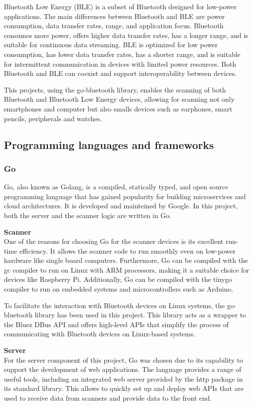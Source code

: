 \documentclass[a4paper, 11pt]{article}
\begin{document}
Bluetooth Low Energy (BLE) is a subset of Bluetooth designed for low-power applications. The main differences between Bluetooth and BLE are power consumption, data transfer rates, range, and application focus. Bluetooth consumes more power, offers higher data transfer rates, has a longer range, and is suitable for continuous data streaming. BLE is optimized for low power consumption, has lower data transfer rates, has a shorter range, and is suitable for intermittent communication in devices with limited power resources. Both Bluetooth and BLE can coexist and support interoperability between devices.

This projects, using the go-bluetooth library, enables the scanning of both Bluetooth and Bluetooth Low Energy devices, allowing for scanning not only smartphones and computer but also smalls devices such as earphones, smart pencils, peripherals and watches.

\subsection{Programming languages and frameworks}
\subsubsection{Go}
Go, also known as Golang, is a compiled, statically typed, and open source programming language that has gained popularity for building microservices and cloud architectures. It is developed and mainteined by Google. In this project, both the server and the scanner logic are written in Go.

\textbf{Scanner}\\
One of the reasons for choosing Go for the scanner devices is its excellent run-time efficiency. It allows the scanner code to run smoothly even on low-power hardware like single board computers. Furthermore, Go can be compiled with the gc compiler to run on Linux with ARM processors, making it a suitable choice for devices like Raspberry Pi. Additionally, Go can be compiled with the tinygo compiler to run on embedded systems and microcontrollers such as Arduino.

To facilitate the interaction with Bluetooth devices on Linux systems, the go-bluetooth library \cite{go-bluetooth} has been used in this project. This library acts as a wrapper to the Bluez DBus API and offers high-level APIs that simplify the process of communicating with Bluetooth devices on Linux-based systems.

\textbf{Server}\\
For the server component of this project, Go was chosen due to its capability to support the development of web applications. The language provides a range of useful tools, including an integrated web server provided by the http package \cite{go-http} in its standard library. This allows to quickly set up and deploy web APIs that are used to receive data from scanners and provide data to the front end.
\end{document}
